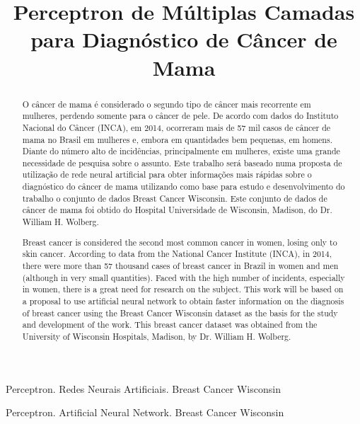 \documentclass[conference]{IEEEtran}
\begin{document}
\title{Perceptron de Múltiplas Camadas para Diagnóstico de Câncer de Mama}

\author{
    \and
    \and
}
\maketitle

\begin{abstract}
O câncer de mama é considerado o segundo tipo de câncer mais recorrente em mulheres, perdendo somente para o câncer de pele. De acordo com dados do Instituto Nacional do Câncer (INCA), em 2014, ocorreram mais de 57 mil casos de câncer de mama no Brasil em mulheres e, embora em quantidades bem pequenas, em homens. Diante do número alto de incidências, principalmente em mulheres, existe uma grande necessidade de pesquisa sobre o assunto. Este trabalho será baseado numa proposta de utilização de rede neural artificial para obter informações mais rápidas sobre o diagnóstico do câncer de mama utilizando como base para estudo e desenvolvimento do trabalho o conjunto de dados Breast Cancer Wisconsin. Este conjunto de dados de câncer de mama foi obtido do Hospital Universidade de Wisconsin, Madison, do Dr. William H. Wolberg. 

\end{abstract}

\begin{IEEEkeywords}
Perceptron. Redes Neurais Artificiais. Breast Cancer Wisconsin
\end{IEEEkeywords}
\begin{abstract}
Breast cancer is considered the second most common cancer in women, losing only to skin cancer. According to data from the National Cancer Institute (INCA), in 2014, there were more than 57 thousand cases of breast cancer in Brazil in women and men (although in very small quantities). Faced with the high number of incidents, especially in women, there is a great need for research on the subject. This work will be based on a proposal to use artificial neural network to obtain faster information on the diagnosis of breast cancer using the Breast Cancer Wisconsin dataset as the basis for the study and development of the work. This breast cancer dataset was obtained from the University of Wisconsin Hospitals, Madison, by Dr. William H. Wolberg. 

\end{abstract}
\begin{IEEEkeywords}
Perceptron. Artificial Neural Network. Breast Cancer Wisconsin
\end{IEEEkeywords}
\end{document}
